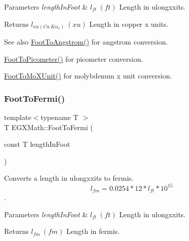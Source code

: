 \begin{DoxyParams}{Parameters}
{\em length\+In\+Foot} & $ l_{ft}\ (ft)$ Length in ulongxxits. \\
\hline
\end{DoxyParams}
\begin{DoxyReturn}{Returns}
$ l_{xu(Cu\ K\alpha_1)}\ (xu)$ Length in copper x units. 
\end{DoxyReturn}
\begin{DoxySeeAlso}{See also}
\mbox{\hyperlink{group___e_g_x_math-_conversions-_length_conversions-_imperial-_foot-_non-_s_i_ga39b1712b38ad7c61cb859376f07decda}{Foot\+To\+Angstrom()}} for angstrom conversion. 

\mbox{\hyperlink{group___e_g_x_math-_conversions-_length_conversions-_imperial-_foot-_s_i_ga2d46da89e13218f0c8d75356c0d03942}{Foot\+To\+Picometer()}} for picometer conversion. 

\mbox{\hyperlink{group___e_g_x_math-_conversions-_length_conversions-_imperial-_foot-_non-_s_i_ga06bc5f701660697593ed1aacd4abd3d6}{Foot\+To\+Mo\+X\+Unit()}} for molybdenum x unit conversion. 
\end{DoxySeeAlso}
\mbox{\label{group___e_g_x_math-_conversions-_length_conversions-_imperial-_foot-_non-_s_i_gac61392c75e58e12f6a8a99aa765f22a0}} 
\subsubsection{\texorpdfstring{Foot\+To\+Fermi()}{FootToFermi()}}
{\footnotesize\ttfamily template$<$typename T $>$ \\
T E\+G\+X\+Math\+::\+Foot\+To\+Fermi (\begin{DoxyParamCaption}\item[{const T}]{length\+In\+Foot }\end{DoxyParamCaption})}



Converts a length in ulongxxits to fermis. \[ l_{fm}=0.0254 * 12 * l_{ft} * 10^{15} \]. 


\begin{DoxyParams}{Parameters}
{\em length\+In\+Foot} & $ l_{ft}\ (ft)$ Length in ulongxxits. \\
\hline
\end{DoxyParams}
\begin{DoxyReturn}{Returns}
$ l_{fm}\ (fm)$ Length in fermis. 
\end{DoxyReturn}
\mbox{\label{group___e_g_x_math-_conversions-_length_conversions-_imperial-_foot-_non-_s_i_ga0360d043c5150d90e61ad28c1fb81cc1}} 
